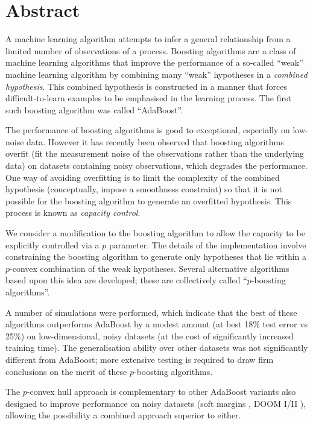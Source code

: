 
\chapter{Abstract}

A machine learning algorithm attempts to infer a general relationship
from a limited number of observations of a process.  Boosting
algorithms are a class of machine learning algorithms that improve the
performance of a so-called ``weak'' machine learning algorithm by
combining many ``weak'' hypotheses in a \emph{combined hypothesis}.
This combined hypothesis is constructed in a manner that forces
difficult-to-learn examples to be emphasised in the learning process.
The first such boosting algorithm was called ``AdaBoost''.

The performance of boosting algorithms is good to exceptional,
especially on low-noise data.  However it has recently been observed
that boosting algorithms overfit (fit the measurement noise of the
observations rather than the underlying data) on datasets containing
noisy observations, which degrades the performance.  One way of
avoiding overfitting is to limit the complexity of the combined
hypothesis (conceptually, impose a smoothness constraint) so that it
is not possible for the boosting algorithm to generate an overfitted
hypothesis.  This process is known as \emph{capacity control}.

We consider a modification to the boosting algorithm to allow the
capacity to be explicitly controlled via a $p$ parameter.  The details
of the implementation involve constraining the boosting algorithm to
generate only hypotheses that lie within a $p$-convex combination of
the weak hypotheses.  Several alternative algorithms based upon this
idea are developed; these are collectively called ``$p$-boosting
algorithms''.

A number of simulations were performed, which indicate that the best
of these algorithms outperforms AdaBoost by a modest amount (at best
18\% test error vs 25\%) on low-dimensional, noisy datasets (at the
cost of significantly increased training time).  The generalisation
ability over other datasets was not significantly different from
AdaBoost; more extensive testing is required to draw firm conclusions
on the merit of these $p$-boosting algorithms.

The $p$-convex hull approach is complementary to other AdaBoost
variants also designed to improve performance on noisy datasets (soft
margins \cite{Ratsch98}, DOOM I/II \cite{Mason99}), allowing the
possibility a combined approach superior to either.

